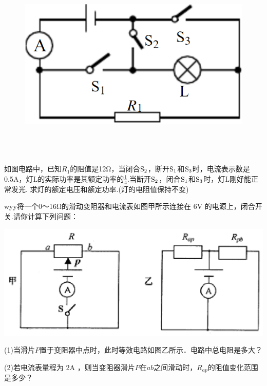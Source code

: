 \documentclass[11pt,a4paper]{article}
\newcommand{\nianfen}[1]{\hspace{-2em}{(#1\textbf{·}\textit{青岛})}}
\begin{document}
{	\rule{0em}{10em}
	
	\begin{figure}
		\includegraphics[width=\linewidth]{2006}
		
	\end{figure}
	
	\mbox{}\\
	
		\mbox{}\\
		
			\mbox{}\\
	
	\nianfen{2006}如图电路中，已知$ R_1 $的阻值是12Ω，当闭合$\rm S_2 $，断开$\rm S_1 $和$\rm S_3 $时，电流表示数是0.5A，灯L的实际功率是其额定功率的$\frac{1}{4}$.当断开$\rm S_2 $，闭合$\rm S_1 $和$\rm S_3 $时，灯L刚好能正常发光. 求灯的额定电压和额定功率.(灯的电阻值保持不变)
	\clearpage
	
	\nianfen{2005}wyy将一个0～16Ω的滑动变阻器和电流表如图甲所示连接在 6V 的电源上，闭合开
	关.请你计算下列问题：
	
	\begin{center}
		\includegraphics[width=0.7\linewidth]{2005}
	\end{center}
	
	(1)当滑片$  P  $\/置于变阻器中点时，此时等效电路如图乙所示．电路中总电阻是多大？
	
	(2)若电流表量程为 2A ，则当变阻器滑片$  P  $在$ab$之间滑动时，$ R_{ap}  $的阻值变化范围是多少？
	
}
\end{document}
